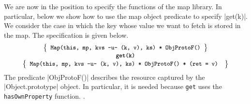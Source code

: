 We are now in the position to specify the functions of the map library. In particular, below we show how to use 
the map object predicate to specify \jsinline|get(k)|.  
%
We consider the case in which the key whose value we  want to fetch is stored in the 
map.  The specification is given below. 
%
\begin{displaymath} 
{\footnotesize
\begin{array}{c}
\left\{ {\begin{array}{c}
 \text{\texttt{Map(this, mp, kvs -u- (k, v), ks) * ObjProtoF()}} \\ 
\end{array}} \right\} \\
%
\text{\bfseries \texttt{get(k)}} \\[0.2mm]
%
\left\{ {\begin{array}{c}
 \text{\texttt{Map(this, mp, kvs -u- (k, v), ks) * ObjProtoF() * (ret = v) }} \\
\end{array}} \right\}
\end{array}
} 
\end{displaymath}
%
The predicate \jsinline|ObjProtoF()| describes the resource captured by the \jsinline|Object.prototype| object. 
In particular, it is needed because \texttt{get} uses the \texttt{hasOwnProperty} function. .
